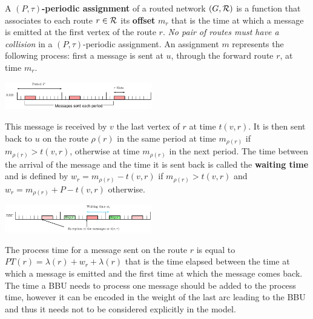 \documentclass[10pt, conference, letterpaper]{IEEEtran}
\begin{document}
         A {\bf $(P,\tau)$-periodic assignment} of a routed network $(G,\cal R)$ is a function that associates to each route 
         $r \in \cal R$ its \textbf{offset} $m_r$ that is the time at which a message is emitted at the first vertex of the route $r$. \emph{No pair of routes must have a collision} in a $(P,\tau)$-periodic assignment.
	 An assignment $m$ represents the following process: first a message is sent at $u$, through the forward route $r$, at time $m_r$.
      \begin{center}
     \hspace{-0.5cm} \includegraphics[width=0.48\textwidth]{rrh.pdf}
      \end{center}

      This message is received by $v$ the last vertex of $r$ at time $t(v,r)$. It is then sent back to $u$ on the route $\rho(r)$ in the same period at time $m_{\rho(r)}$ if $m_{\rho(r)} > t(v,r)$, otherwise at time $m_{\rho(r)}$ in the next period. The time between the arrival of the message and the time it is sent back is called the \textbf{waiting time} and is defined by $w_r = m_{\rho(r)} - t(v,r)$ if $m_{\rho(r)} > t(v,r)$ and $w_r = m_{\rho(r)} + P - t(v,r)$ otherwise.
 
       \begin{center}
       \hspace{-1cm}
      \includegraphics[width=0.48\textwidth]{BBU.pdf}
     \hspace{-1cm}
     \end{center}
      
    
      The process time for a message sent on the route $r$ is equal to
      $PT(r)=\lambda(r)+ w_r+\lambda(r)$ that is the time elapsed between the time at which a message is emitted and the first time at which the message comes back. 
      The time a BBU needs to process one message should be added to the process time, however it can be encoded in the weight of the last arc leading to the BBU and thus it needs not to be considered explicitly in the model.
\end{document}
